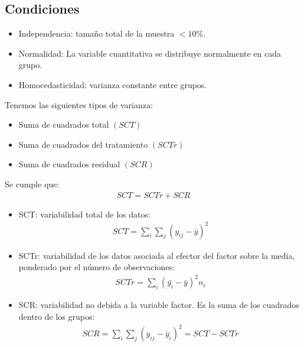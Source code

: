\documentclass{article}
\begin{document}
\subsection{Condiciones}
\begin{itemize}
	\item Independencia: tamaño total de la muestra $< 10\%$.
	\item Normalidad: La variable cuantitativa se distribuye normalmente en cada
		grupo.
	\item Homocedasticidad: varianza constante entre grupos.
\end{itemize}
Tenemos las siguientes tipos de varianza:
\begin{itemize}
	\item Suma de cuadrados total $(SCT)$
	\item Suma de cuadrados del tratamiento $(SCTr)$
	\item Suma de cuadrados residual $(SCR)$ 
\end{itemize}
Se cumple que:
\begin{equation}
	\begin{split}
		SCT = SCTr + SCR
	\end{split}
\end{equation}
\begin{itemize}
	\item SCT: variabilidad total de los datos:
\begin{equation}
	\begin{split}
		SCT = \sum_{i}\sum_{j} (y_{ij}-\bar{y})^{2}
	\end{split}
\end{equation}
	\item SCTr: variabilidad de los datos asociada al efector del factor sobre
		la media, ponderado por el número de observaciones:
\begin{equation}
	\begin{split}
		SCTr = \sum_{i}(\bar{y_{i}}-\bar{y})^{2}n_{i}
	\end{split}
\end{equation}
	\item SCR: variabilidad no debida a la variable factor. Es la suma de los
		cuadrados dentro de los grupos:
\begin{equation}
	\begin{split}
		SCR = \sum_{i}\sum_{j}(y_{ij}-\bar{y}_{i})^{2}=SCT-SCTr
	\end{split}
\end{equation}
\end{itemize}
\end{document}
